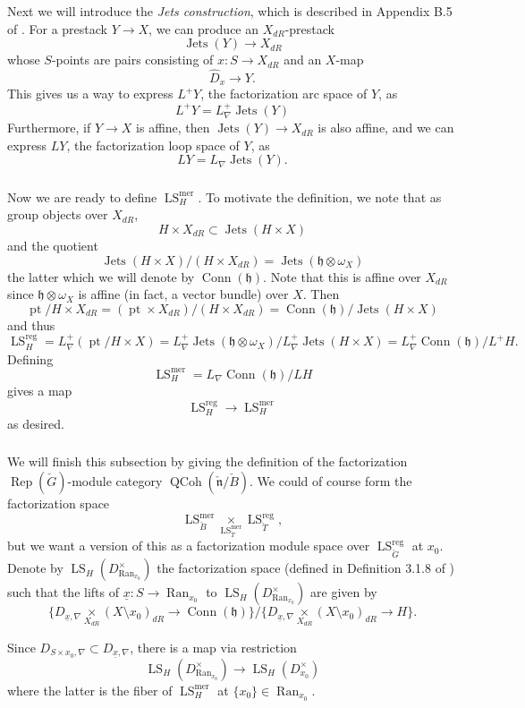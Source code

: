\documentclass[10pt]{amsart}
\theoremstyle{remark}
\newcommand{\on}[1]{\operatorname{#1}}
\newcommand{\Gcheck}{\check{G}}
\newcommand{\ncheck}{\check{\mathfrak{n}}}
\newcommand{\Bcheck}{\check{B}}
\newcommand{\Tcheck}{\check{T}}
\newcommand{\Ran}{\on{Ran}}
\newcommand{\sssec}[1]{\subsubsection{}}
\begin{document}
\sssec{}
Next we will introduce the \emph{Jets construction}, which is described in Appendix B.5 of \cite{GLC2}. For a prestack $Y \to X$, we can produce an $X_{dR}$-prestack
$$
\on{Jets}(Y) \to X_{dR}
$$
whose $S$-points are pairs consisting of $x: S \to X_{dR}$ and an $X$-map
$$
\hat{D}_{x} \to Y.
$$
This gives us a way to express $L^+Y$, the factorization arc space of $Y$, as
$$
L^+Y = L_{\nabla}^+\on{Jets}(Y)
$$
Furthermore, if $Y \to X$ is affine, then $\on{Jets}(Y) \to X_{dR}$ is also affine, and we can express $LY$, the factorization loop space of $Y$, as
$$
LY = L_{\nabla} \on{Jets}(Y).
$$

\sssec{}
Now we are ready to define $\on{LS}_{H}^{\on{mer}}$. To motivate the definition, we note that as group objects over $X_{dR}$,
$$
H \times X_{dR} \subset \on{Jets}(H \times X)
$$
and the quotient
$$
\on{Jets}(H \times X)/(H \times X_{dR}) = \on{Jets}(\mathfrak{h} \otimes \omega_{X})
$$
the latter which we will denote by $\on{Conn}(\mathfrak{h})$. Note that this is affine over $X_{dR}$ since $\mathfrak{h} \otimes \omega_X$ is affine (in fact, a vector bundle) over $X$. Then
$$
\on{pt}/H \times X_{dR} = (\on{pt} \times X_{dR})/(H \times X_{dR}) = \on{Conn}(\mathfrak{h})/\on{Jets}(H \times X)
$$
and thus
$$
\on{LS}_{H}^{\on{reg}} = L_{\nabla}^+(\on{pt}/H \times X) = L_{\nabla}^+\on{Jets}(\mathfrak{h} \otimes \omega_{X})/L_{\nabla}^+\on{Jets}(H \times X) = L_{\nabla}^+\on{Conn}(\mathfrak{h})/L^+H.
$$
Defining
$$
\on{LS}_{H}^{\on{mer}} = L_{\nabla}\on{Conn}(\mathfrak{h})/LH
$$
gives a map
$$
\on{LS}_H^{\on{reg}} \to \on{LS}_{H}^{\on{mer}}
$$
as desired.

\sssec{}
We will finish this subsection by giving the definition of the factorization $\on{Rep}(\check{G})$-module category $\on{QCoh}(\ncheck/\Bcheck)$. We could of course form the factorization space
$$
\on{LS}_{\Bcheck}^{\on{mer}} \underset{\on{LS}_{\Tcheck}^{\on{mer}}}{\times} \on{LS}_{\Tcheck}^{\on{reg}},
$$
but we want a version of this as a factorization module space over $\on{LS}_{\Gcheck}^{\on{reg}}$ at $x_0$. Denote by $\on{LS}_H(D_{\Ran_{x_0}}^{\times})$ the factorization space (defined in Definition 3.1.8 of \cite{Katia}) such that the lifts of $\underline{x}: S \to \on{Ran}_{x_0}$ to $\on{LS}_H(D_{\Ran_{x_0}}^{\times})$ are given by
$$
\{D_{\underline{x}, \nabla} \underset{X_{dR}}{\times} (X \setminus x_0)_{dR} \to \on{Conn}(\mathfrak{h})\}/\{D_{\underline{x}, \nabla} \underset{X_{dR}}{\times} (X \setminus x_0)_{dR} \to H\}.
$$

Since $D_{S \times x_0, \nabla} \subset D_{\underline{x}, \nabla}$, there is a map via restriction
$$
\on{LS}_H(D_{\Ran_{x_0}}^{\times}) \to \on{LS}_H(D_{x_0}^{\times})
$$
where the latter is the fiber of $\on{LS}_H^{\on{mer}}$ at $\{x_0\} \in \Ran_{x_0}$.
\end{document}
